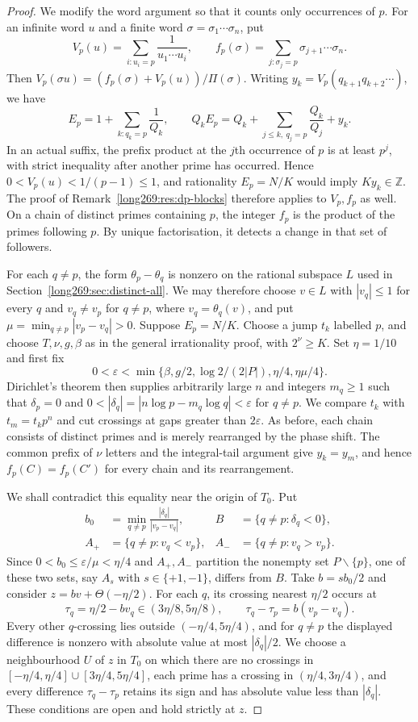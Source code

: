 \documentclass[11pt]{article}
\theoremstyle{remark}
\theoremstyle{plain}
\begin{document}
\begin{proof}
We modify the word argument so that it counts only occurrences of $p$.
For an infinite word $u$ and a finite word $\sigma=\sigma_1\cdots\sigma_n$,
put
\[
 V_p(u)=\sum_{i:u_i=p}\frac1{u_1\cdots u_i},\qquad
 f_p(\sigma)=\sum_{j:\sigma_j=p}\sigma_{j+1}\cdots\sigma_n.
\]
Then $V_p(\sigma u)=(f_p(\sigma)+V_p(u))/\Pi(\sigma)$. Writing
$y_k=V_p(q_{k+1}q_{k+2}\cdots)$, we have
\[
 E_p=1+\sum_{k:q_k=p}\frac1{Q_k},\qquad
 Q_kE_p=Q_k+\sum_{j\le k,\ q_j=p}\frac{Q_k}{Q_j}+y_k.
\]
In an actual suffix, the prefix product at the $j$th occurrence of $p$
is at least $p^j$, with strict inequality after another prime has
occurred. Hence $0<V_p(u)<1/(p-1)\le1$, and rationality $E_p=N/K$
would imply $Ky_k\in\mathbb Z$. The proof of
Remark~\ref{long269:res:dp-blocks} therefore applies to $V_p,f_p$ as well.
On a chain of distinct primes containing $p$, the integer $f_p$ is the
product of the primes following $p$. By unique factorisation, it detects
a change in that set of followers.

For each $q\ne p$, the form $\theta_p-\theta_q$ is nonzero on the
rational subspace $L$ used in Section~\ref{long269:sec:distinct-all}.
We may therefore choose $v\in L$ with $|v_q|\le1$ for every $q$ and
$v_q\ne v_p$ for $q\ne p$, where $v_q=\theta_q(v)$, and put
$\mu=\min_{q\ne p}|v_p-v_q|>0$. Suppose $E_p=N/K$. Choose a jump
$t_k$ labelled $p$, and choose $T,\nu,g,\beta$ as in the general
irrationality proof, with $2^\nu\ge K$. Set $\eta=1/10$ and first fix
\[
 0<\varepsilon<\min\{\beta,g/2,\log2/(2|P|),\eta/4,\eta\mu/4\}.
\]
Dirichlet's theorem then supplies arbitrarily large $n$ and integers
$m_q\ge1$ such that $\delta_p=0$ and
$0<|\delta_q|=|n\log p-m_q\log q|<\varepsilon$ for $q\ne p$.
We compare $t_k$ with $t_m=t_kp^n$ and cut crossings at gaps greater than
$2\varepsilon$. As before, each chain consists of distinct primes and
is merely rearranged by the phase shift. The common prefix of $\nu$
letters and the integral-tail argument give $y_k=y_m$, and hence
$f_p(C)=f_p(C')$ for every chain and its rearrangement.

We shall contradict this equality near the origin of $T_0$. Put
\[
 \begin{aligned}
 b_0&=\min_{q\ne p}\frac{|\delta_q|}{|v_p-v_q|},
 &B&=\{q\ne p:\delta_q<0\},\\
 A_+&=\{q\ne p:v_q<v_p\},
 &A_-&=\{q\ne p:v_q>v_p\}.
 \end{aligned}
\]
Since $0<b_0\le\varepsilon/\mu<\eta/4$ and $A_+,A_-$ partition the
nonempty set $P\smallsetminus\{p\}$, one of these two sets, say $A_s$ with
$s\in\{+1,-1\}$, differs from $B$. Take $b=sb_0/2$ and consider
$z=bv+\Theta(-\eta/2)$. For each $q$, its crossing nearest $\eta/2$
occurs at
\[
 \tau_q=\eta/2-bv_q\in(3\eta/8,5\eta/8),\qquad
 \tau_q-\tau_p=b(v_p-v_q).
\]
Every other $q$-crossing lies outside $(-\eta/4,5\eta/4)$, and for
$q\ne p$ the displayed difference is nonzero with absolute value at most
$|\delta_q|/2$. We choose a neighbourhood $U$ of $z$ in $T_0$ on which
there are no crossings in $[-\eta/4,\eta/4]\cup[3\eta/4,5\eta/4]$,
each prime has a crossing in $(\eta/4,3\eta/4)$, and every difference
$\tau_q-\tau_p$ retains its sign and has absolute value less than
$|\delta_q|$. These conditions are open and hold strictly at $z$.


\end{proof}
\end{document}
